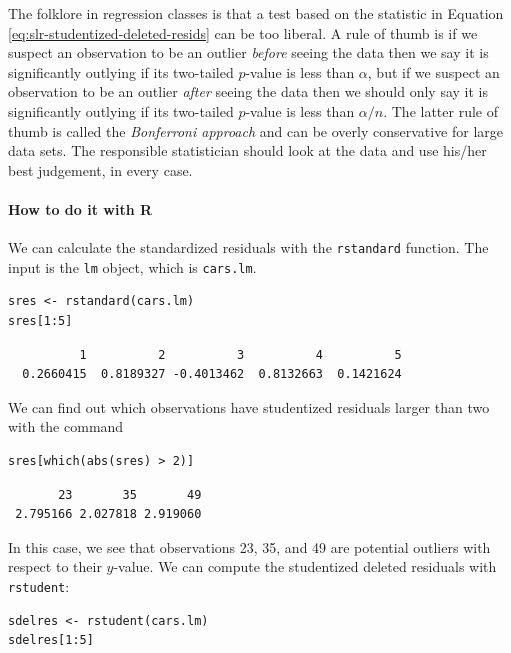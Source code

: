 \documentclass[captions=tableheading]{scrbook}
\begin{document}
The folklore in regression classes is that a test based on the statistic in Equation \ref{eq:slr-studentized-deleted-resids} can be too liberal. A rule of thumb is if we suspect an observation to be an outlier \emph{before} seeing the data then we say it is significantly outlying if its two-tailed \(p\)-value is less than \(\alpha\), but if we suspect an observation to be an outlier \emph{after} seeing the data then we should only say it is significantly outlying if its two-tailed \(p\)-value is less than \(\alpha/n\). The latter rule of thumb is called the \emph{Bonferroni approach} and can be overly conservative for large data sets. The responsible statistician should look at the data and use his/her best judgement, in every case.


\paragraph*{How to do it with \textsf{R}}

We can calculate the standardized residuals with the \texttt{rstandard} function. The input is the \texttt{lm} object, which is \texttt{cars.lm}.


\begin{verbatim}
sres <- rstandard(cars.lm)
sres[1:5]
\end{verbatim}

\begin{verbatim}
          1          2          3          4          5 
  0.2660415  0.8189327 -0.4013462  0.8132663  0.1421624
\end{verbatim}

We can find out which observations have studentized residuals larger than two with the command


\begin{verbatim}
sres[which(abs(sres) > 2)]
\end{verbatim}

\begin{verbatim}
       23       35       49 
 2.795166 2.027818 2.919060
\end{verbatim}

In this case, we see that observations 23, 35, and 49 are potential outliers with respect to their \(y\)-value.  We can compute the studentized deleted residuals with \texttt{rstudent}:


\begin{verbatim}
sdelres <- rstudent(cars.lm)
sdelres[1:5]
\end{verbatim}
\end{document}
